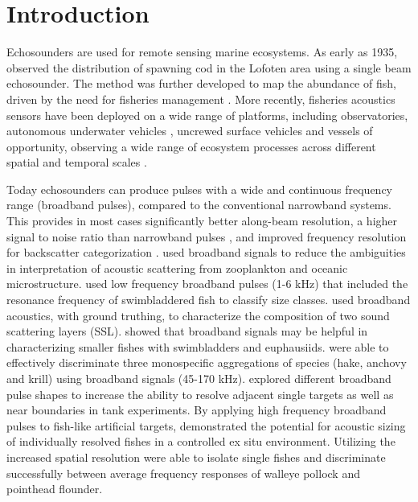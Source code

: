 \documentclass[preprint,12pt,TurnOnLineNumbers]{JASAnew}
\begin{document}
\maketitle


\section{Introduction}

Echosounders are used for remote sensing marine ecosystems. As early as 1935, \citet{sund_echo_1935} observed the distribution of spawning cod in the Lofoten area using a single beam echosounder. The method was further developed to map the abundance of fish, driven by the need for fisheries management \citep{Simmonds2005Fisheries}. More recently, fisheries acoustics sensors have been deployed on a wide range of platforms, including observatories, autonomous underwater vehicles \citep{fernandes_autonomous_2003}, uncrewed surface vehicles \citep{de_robertis_uncrewed_2021} and vessels of opportunity, observing a wide range of ecosystem processes across different spatial and temporal scales \citep{godo_marine_2014}.

Today echosounders can produce pulses with a wide and continuous frequency range (broadband pulses), compared to the conventional narrowband systems. This provides in most cases significantly better along-beam resolution, a higher signal to noise ratio than narrowband pulses \citep{Chu1998Application, ehrenbergFMSlideChirp2000}, and improved frequency resolution for backscatter categorization \citep{korneliussen2018}.  \citet{lavery_measurements_2010} used broadband signals to reduce the ambiguities in interpretation of acoustic scattering from zooplankton and oceanic microstructure. \citet{Stanton2012Resonance} used low frequency broadband pulses (1-6 kHz) that included the resonance frequency of swimbladdered fish to classify size classes. \citet{blanluet_characterization_2019} used broadband acoustics, with ground truthing, to characterize the composition of two sound scattering layers (SSL). \citet{bassett_broadband_2018} showed that broadband signals may be helpful in characterizing smaller fishes with swimbladders and euphausiids. \citet{benoit-bird_exploring_2020} were able to effectively discriminate three monospecific aggregations of species (hake, anchovy and krill) using broadband signals (45-170 kHz). \citet{lavery2017} explored different broadband pulse shapes to increase the ability to resolve adjacent single targets as well as near boundaries in tank experiments. By applying high frequency broadband pulses to fish-like artificial targets, \citet{kubilius_remote_2020} demonstrated the potential for acoustic sizing of individually resolved fishes in a controlled ex situ environment. Utilizing the increased spatial resolution \citet{hasegawa_situ_2021} were able to isolate single fishes and discriminate successfully between average frequency responses of walleye pollock and pointhead flounder.
\end{document}
